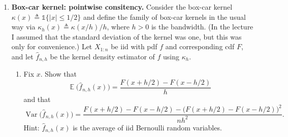 \documentclass[11pt]{report}
\DeclareMathOperator{\Exp}{\mathbb{E}}
\DeclareMathOperator{\Var}{\text{Var}}
\newcommand{\ind}{{\mathds{1}}}
\newcommand{\teq}{\triangleq}
\begin{document}
\begin{enumerate}[1.]
\begin{enumerate}[(a)]
          \end{enumerate}





          \pagebreak


    \item {\bf Box-car kernel: pointwise consitency.}
          Consider the box-car kernel $\kappa(x) \teq \ind\{|x|\leq 1/2\}$ and define the family of box-car kernels in the usual way via $\kappa_h(x)\teq \kappa(x/h)/h$, where $h > 0$ is the bandwidth. (In the lecture I assumed that the standard deviation of the kernel was one, but this was only for convenience.)
          Let $X_{1:n}$ be iid with pdf $f$ and corresponding cdf $F$, and let $\widehat f_{n,h}$ be the kernel density estimator of $f$ using $\kappa_h$.
          \begin{enumerate}
              \item Fix $x$. Show that
                    \[ \Exp\bigl(\widehat f_{n,h}(x)\bigr) = \frac{F(x+h/2)-F(x-h/2)}{h} \]
                    and that
                    \[ \Var\bigl(\widehat f_{n,h}(x)\bigr) = \frac{F(x+h/2)-F(x-h/2) - \bigl(F(x+h/2)-F(x-h/2)\bigr)^2}{nh^2} . \]
                    Hint: $\widehat f_{n,h}(x)$ is the average of iid Bernoulli random variables.


\end{enumerate}
\end{enumerate}
\end{document}
